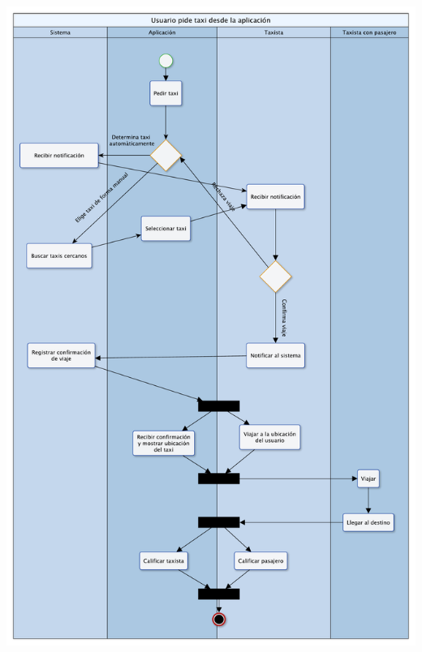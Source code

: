 \documentclass[a4paper]{article}
\begin{document}
\begin{center}
\includegraphics[scale=0.5]{DA_Pide_Taxi.pdf}
\end{center}
\end{document}
